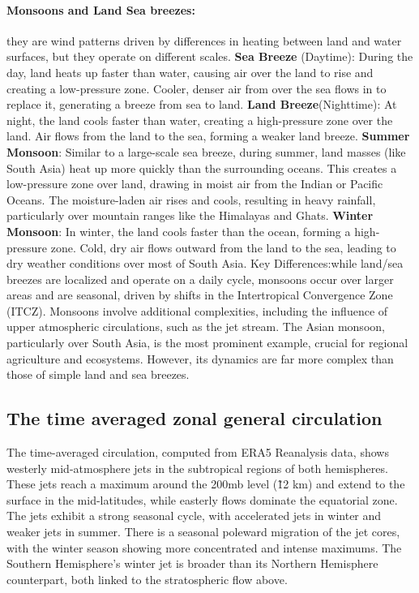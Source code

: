 \paragraph{Monsoons and Land Sea breezes:} they are wind patterns driven by differences in heating between land and water surfaces, but they operate on different scales.
\newline \textbf{Sea Breeze} (Daytime): During the day, land heats up faster than water, causing air over the land to rise and creating a low-pressure zone. Cooler, denser air from over the sea flows in to replace it, generating a breeze from sea to land.
\newline \textbf{Land Breeze}(Nighttime): At night, the land cools faster than water, creating a high-pressure zone over the land. Air flows from the land to the sea, forming a weaker land breeze.
\newline \textbf{Summer Monsoon}: Similar to a large-scale sea breeze, during summer, land masses (like South Asia) heat up more quickly than the surrounding oceans. This creates a low-pressure zone over land, drawing in moist air from the Indian or Pacific Oceans. The moisture-laden air rises and cools, resulting in heavy rainfall, particularly over mountain ranges like the Himalayas and Ghats.
\newline \textbf{Winter Monsoon}: In winter, the land cools faster than the ocean, forming a high-pressure zone. Cold, dry air flows outward from the land to the sea, leading to dry weather conditions over most of South Asia.
\newline Key Differences:while land/sea breezes are localized and operate on a daily cycle, monsoons occur over larger areas and are seasonal, driven by shifts in the Intertropical Convergence Zone (ITCZ).
Monsoons involve additional complexities, including the influence of upper atmospheric circulations, such as the jet stream.
The Asian monsoon, particularly over South Asia, is the most prominent example, crucial for regional agriculture and ecosystems. However, its dynamics are far more complex than those of simple land and sea breezes.

\subsection{The time averaged zonal general circulation}
The time-averaged circulation, computed from ERA5 Reanalysis data, shows westerly mid-atmosphere jets in the subtropical regions of both hemispheres. These jets reach a maximum around the 200mb level (\~12 km) and extend to the surface in the mid-latitudes, while easterly flows dominate the equatorial zone. The jets exhibit a strong seasonal cycle, with accelerated jets in winter and weaker jets in summer. There is a seasonal poleward migration of the jet cores, with the winter season showing more concentrated and intense maximums. The Southern Hemisphere's winter jet is broader than its Northern Hemisphere counterpart, both linked to the stratospheric flow above.

